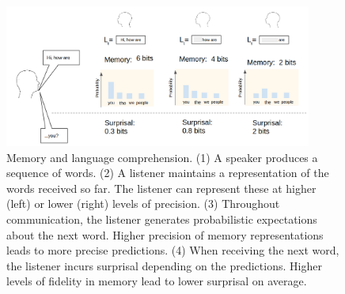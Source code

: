 
%
%



\begin{figure}
\centering
\includegraphics[width=0.9\textwidth]{figures-gdrive/communication.png}
	\caption{Memory and language comprehension. (1) A speaker produces a sequence of words. (2) A listener maintains a representation of the words received so far. The listener can represent these at higher (left) or lower (right) levels of precision. (3) Throughout communication, the listener generates probabilistic expectations about the next word. Higher precision of memory representations leads to more precise predictions. (4) When receiving the next word, the listener incurs surprisal depending on the predictions. Higher levels of fidelity in memory lead to lower surprisal on average.  }
	\label{fig:communication}
\end{figure}

